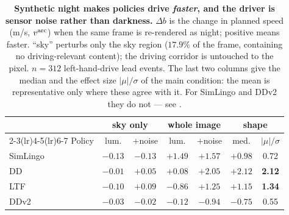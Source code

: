 \begin{table}[t]
\centering
\caption{\textbf{Synthetic night makes policies drive \emph{faster}, and the driver is
sensor noise rather than darkness.} $\Delta b$ is the change in planned speed
(m/s, $v^{\mathrm{arc}}$) when the same frame is re-rendered as night; positive means faster.
``sky'' perturbs only the sky region ($17.9\%$ of the frame, containing no
driving-relevant content); the driving corridor is untouched to the pixel.
$n{=}312$ left-hand-drive lead events. The last two columns give the median and the effect size $|\mu|/\sigma$ of the main condition: the mean is representative only where these agree with it. For SimLingo and DDv2 they do not --- see .}
\label{tab:deltab}
\small
\setlength{\tabcolsep}{3pt}
\begin{tabular}{@{}lcccccc@{}}
\toprule
& \multicolumn{2}{c}{sky only} & \multicolumn{2}{c}{whole image} & \multicolumn{2}{c}{shape} \\
\cmidrule(lr){2-3}\cmidrule(lr){4-5}\cmidrule(lr){6-7}
Policy & lum. & $+$noise & lum. & $+$noise & med. & $|\mu|/\sigma$ \\
\midrule
SimLingo & $-0.13$ & $-0.13$ & $+1.49$ & $+1.57$ & $+0.98$ & 0.72 \\
DD & $-0.01$ & $+0.05$ & $+0.08$ & $+2.05$ & $+2.12$ & \textbf{2.12} \\
LTF & $-0.10$ & $+0.09$ & $-0.86$ & $+1.25$ & $+1.15$ & \textbf{1.34} \\
DDv2 & $-0.03$ & $-0.02$ & $-0.12$ & $-0.94$ & $-0.75$ & 0.55 \\
\bottomrule
\end{tabular}
\end{table}